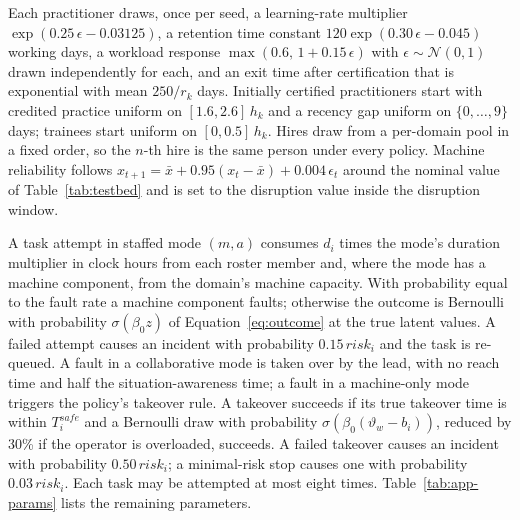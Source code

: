 \documentclass[utf8]{frontiers_suppmat}
\begin{document}
Each practitioner draws, once per seed, a learning-rate multiplier $\exp(0.25\,\epsilon-0.03125)$, a retention time constant $120\exp(0.30\,\epsilon-0.045)$ working days, a workload response $\max(0.6,\,1+0.15\,\epsilon)$ with $\epsilon\sim\mathcal{N}(0,1)$ drawn independently for each, and an exit time after certification that is exponential with mean $250/r_k$ days. Initially certified practitioners start with credited practice uniform on $[1.6,2.6]\,h_k$ and a recency gap uniform on $\{0,\ldots,9\}$ days; trainees start uniform on $[0,0.5]\,h_k$. Hires draw from a per-domain pool in a fixed order, so the $n$-th hire is the same person under every policy. Machine reliability follows $x_{t+1}=\bar x + 0.95(x_t-\bar x)+0.004\,\epsilon_t$ around the nominal value of Table~\ref{tab:testbed} and is set to the disruption value inside the disruption window.

A task attempt in staffed mode $(m,a)$ consumes $d_i$ times the mode's duration multiplier in clock hours from each roster member and, where the mode has a machine component, from the domain's machine capacity. With probability equal to the fault rate a machine component faults; otherwise the outcome is Bernoulli with probability $\sigma(\beta_0 z)$ of Equation~\eqref{eq:outcome} at the true latent values. A failed attempt causes an incident with probability $0.15\,risk_i$ and the task is re-queued. A fault in a collaborative mode is taken over by the lead, with no reach time and half the situation-awareness time; a fault in a machine-only mode triggers the policy's takeover rule. A takeover succeeds if its true takeover time is within $T^{safe}_i$ and a Bernoulli draw with probability $\sigma(\beta_0(\vartheta_w-b_i))$, reduced by 30\% if the operator is overloaded, succeeds. A failed takeover causes an incident with probability $0.50\,risk_i$; a minimal-risk stop causes one with probability $0.03\,risk_i$. Each task may be attempted at most eight times. Table~\ref{tab:app-params} lists the remaining parameters.
\end{document}
